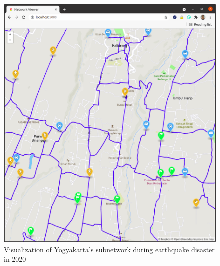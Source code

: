 \documentclass[conference]{IEEEtran}
\begin{document}
\begin{figure}
\centerline{\includegraphics[scale=0.25]{subnetwork-visualization-zoom-1-yogyakarta.png}}
\caption{Visualization of Yogyakarta's subnetwork during earthquake disaster in 2020}
\label{fig_yogyakarta_subnetwork_visualized}
\end{figure}
\end{document}
